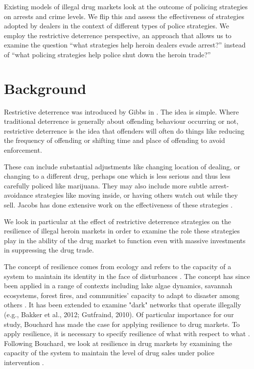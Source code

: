 \documentclass[runningheads,a4paper]{llncs}
\begin{document}
Existing models of illegal drug markets look at the outcome of policing strategies on arrests and crime levels. We flip this and assess the effectiveness of strategies adopted by dealers in the context of different types of police strategies.
We employ the restrictive deterrence perspective, an approach that allows us to examine the question “what strategies help heroin dealers evade arrest?” instead of “what policing strategies help police shut down the heroin trade?”


\section{Background}

Restrictive deterrence was introduced by Gibbs in \cite{gibbs_crime_1975}. The idea is simple. Where traditional deterrence is generally about offending behaviour occurring or not, restrictive deterrence is the idea that offenders will often do things like reducing the frequency of offending or shifting time and place of offending to avoid enforcement.

These can include substantial adjustments like changing location of dealing, or changing to a different drug, perhaps one which is less serious and thus less carefully policed like marijuana. They may also include more subtle arrest-avoidance strategies like moving inside, or having others watch out while they sell. Jacobs has done extensive work on the effectiveness of these strategies \cite{jacobs_undercover_1993,jacobs_crack_1996,jacobs_auto_2014}. %

We look in particular at the effect of restrictive deterrence strategies on the resilience of illegal heroin markets in order to examine the role these strategies play in the ability of the drug market to function even with massive investments in suppressing the drug trade.

The concept of resilience comes from ecology and refers to the capacity of a system to maintain its identity in the face of disturbances \cite{carpenter_metaphor_2001}. The concept has since been applied in a range of contexts including lake algae dynamics, savannah ecosystems, forest fires, and communities' capacity to adapt to disaster among others \cite{walker_thresholds_2004}. It has been extended to examine "dark" networks that operate illegally (e.g., Bakker et al., 2012; Gutfraind, 2010). Of particular importance for our study, Bouchard has made the case for applying resilience to drug markets. To apply resilience, it is necessary to specify resilience of what with respect to what \cite{carpenter_metaphor_2001}. Following Bouchard, we look at resilience in drug markets by examining the capacity of the system to maintain the level of drug sales under police intervention \cite{bouchard_resilience_2007}.
\end{document}
